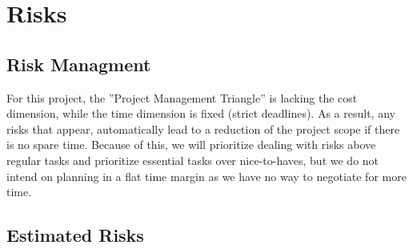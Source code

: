 \chapter{Risks}
\section{Risk Managment}
For this project, the ”Project Management Triangle” is lacking the cost dimension, while the time dimension is fixed (strict deadlines). As a result, any risks that appear, automatically lead to a reduction of the project scope if there is no spare time. Because of this, we will prioritize dealing with risks above regular tasks and prioritize essential tasks over nice-to-haves, but we do not intend on planning in a flat time margin as we have no way to negotiate for more time.

\section{Estimated Risks}

